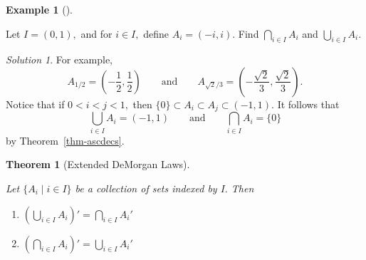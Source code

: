 \documentclass[
  letterpaper,
  10pt,
  reqno,
  twopage,
  openany]{book}
\providecommand{\tightlist}{%
  \setlength{\itemsep}{0pt}\setlength{\parskip}{0pt}}\usepackage{longtable,booktabs,array}
\theoremstyle{plain}
\theoremstyle{definition}
\theoremstyle{definition}
\theoremstyle{definition}
\newtheorem{example}{Example}[chapter]
\theoremstyle{plain}
\theoremstyle{plain}
\newtheorem{theorem}{Theorem}[chapter]
\theoremstyle{remark}
\newtheorem*{solution}{Solution}
\begin{document}
\leavevmode{}%
\begin{example}[]\label{exm-cap-cup-2}

Let \(I=(0,1),\) and for \(i\in I,\) define \(A_i=(-i,i).\) Find
\(\bigcap_{i\in I} A_i\) and \(\bigcup_{i\in I} A_i.\)

\end{example}

\begin{solution}

For example, \[
A_{1/2}=\left(-\frac{1}{2},\frac{1}{2}\right)
\qquad \text{and}\qquad
A_{\sqrt{2}/3}=\left(-\frac{\sqrt{2}}{3},\frac{\sqrt{2}}{3}\right).
\] Notice that if \(0<i<j<1,\) then
\(\{0\}\subset A_i \subset A_j \subset (-1,1).\) It follows that \[
\label{intexatwo}
\bigcup_{i\in I} A_i =(-1,1)
\qquad \text{and} \qquad 
\bigcap_{i\in I} A_i =\{0\}
\] by Theorem~\ref{thm-ascdecs}.

\end{solution}

\leavevmode{}%
\begin{theorem}[Extended DeMorgan
Laws]\label{thm-extended-demorgan-laws}

Let \(\{A_i \mid i\in I\}\) be a collection of sets indexed by \(I.\)
Then

\begin{enumerate}
\def\labelenumi{\arabic{enumi}.}
\tightlist
\item
  \(\left(\bigcup_{i\in I} A_i\right)' =\bigcap_{i\in I} A_i'\)
\item
  \(\left(\bigcap_{i\in I} A_i\right)' =\bigcup_{i\in I} A_i'\)
\end{enumerate}

\end{theorem}
\end{document}
